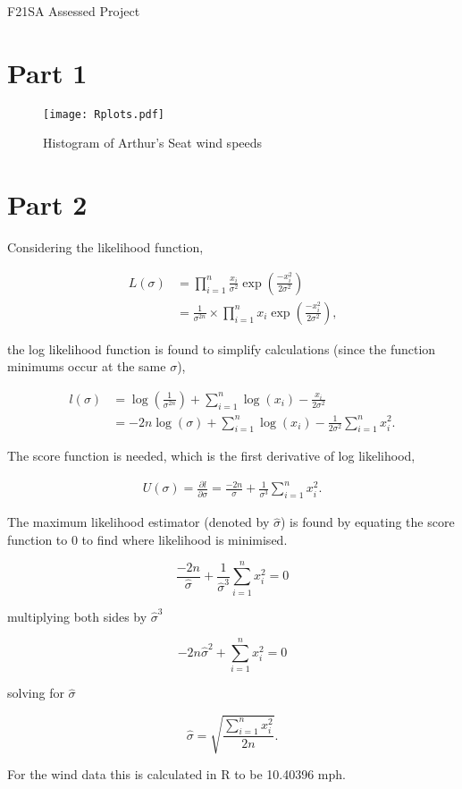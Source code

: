 \documentclass[11pt]{article}
\begin{document}
\begin{center}
    \Large{F21SA Assessed Project}
\end{center}

\section*{Part 1}

\begin{figure}[ht]
    \centering
	\texttt{[image: Rplots.pdf]}
    \caption{Histogram of Arthur's Seat wind speeds}
    \label{fig:histogram}
\end{figure}

\section*{Part 2}

Considering the likelihood function,

\begin{align*}
    L(\sigma) &= \prod_{i=1}^n{ \frac{x_i}{\sigma^2} \exp\left( \frac{-x_i^2}{2 \sigma^2} \right)} \\
    &= \frac{1}{\sigma^{2n}} \times \prod_{i=1}^n{ x_i \exp\left( \frac{-x_i^2}{2 \sigma^2} \right)} \text{,}
\end{align*}

the log likelihood function is found to simplify calculations (since the function minimums occur at the same $\sigma$),

\begin{align*}
    l(\sigma) &= \log\left(\frac{1}{\sigma^{2n}}\right) + \sum_{i=1}^n{ \log(x_i) - \frac{x_i}{2 \sigma^2} } \\
    &= -2n \log(\sigma) + \sum_{i=1}^n{\log(x_i)} - \frac{1}{2 \sigma^2} \sum_{i=1}^n{x_i^2} \text{.}
\end{align*}

The score function is needed, which is the first derivative of log likelihood,

\begin{align*}
    U(\sigma) = \frac{\partial l}{\partial \sigma} = \frac{-2n}{\sigma} + \frac{1}{\sigma^3} \sum_{i=1}^n{x_i^2} \text{.}
\end{align*}

The maximum likelihood estimator (denoted by $ \hat\sigma $) is found by equating the score function to 0 to find where likelihood is minimised.

$$
    \frac{-2n}{\hat{\sigma}} + \frac{1}{\hat{\sigma}^3} \sum_{i=1}^n{x_i^2} = 0
$$

multiplying both sides by $ \hat{\sigma}^3 $

$$
-2n \hat\sigma^2 + \sum_{i=1}^n{x_i^2} = 0
$$

solving for $ \hat\sigma $

$$
\hat\sigma = \sqrt{\frac{\sum_{i=1}^n{x_i^2}}{2n}} \text{.}
$$


For the wind data this is calculated in R to be 10.40396 mph.
\end{document}
